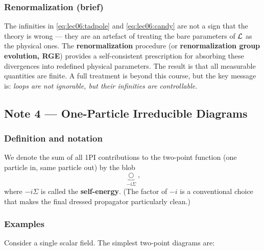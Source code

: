 \documentclass[../main.tex]{subfiles}
\begin{document}
\subsubsection*{Renormalization (brief)}

The infinities in \eqref{eq:lec06:tadpole} and \eqref{eq:lec06:candy} are not a sign that the theory is wrong — they are an artefact of treating the bare parameters of $\mathcal{L}$ as the physical ones.  The \textbf{renormalization} procedure (or \textbf{renormalization group evolution, RGE}) provides a self-consistent prescription for absorbing these divergences into redefined physical parameters.  The result is that all measurable quantities are finite.  A full treatment is beyond this course, but the key message is: \emph{loops are not ignorable, but their infinities are controllable}.

\subsection*{Note 4 — One-Particle Irreducible Diagrams}

\subsubsection*{Definition and notation}


We denote the sum of all 1PI contributions to the two-point function (one particle in, same particle out) by the blob
\begin{equation}
  \underbrace{\bigcirc}_{\displaystyle -i\Sigma},
  \label{eq:lec06:1pi-blob}
\end{equation}
where $-i\Sigma$ is called the \textbf{self-energy}.  (The factor of $-i$ is a conventional choice that makes the final dressed propagator particularly clean.)

\subsubsection*{Examples}

Consider a single scalar field.  The simplest two-point diagrams are:
\end{document}
